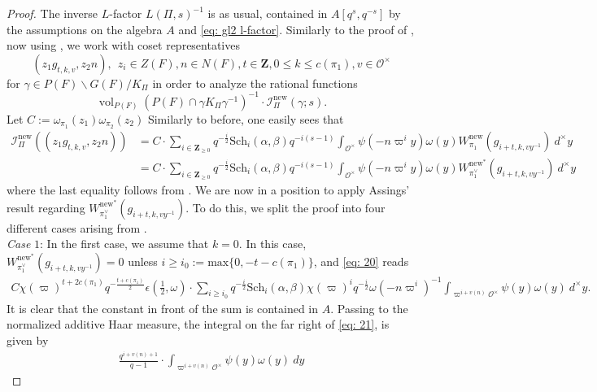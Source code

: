 \documentclass{amsart}
\theoremstyle{plain}
\theoremstyle{plain}
\theoremstyle{remark}
\DeclareMathOperator{\vol}{vol}
\begin{document}
\begin{proof}
   The inverse $L$-factor $L(\Pi,s)^{-1}$ is as usual, contained in $A[q^s,q^{-s}]$ by the assumptions on the algebra $A$ and \eqref{eq: gl2 l-factor}. Similarly to the proof of , now using , we work with coset representatives 
     $$(z_1g_{t,k,v},z_2n),\ \ z_i\in Z(F),n\in N(F),t\in\mathbf{Z}, 0\leq k\leq c(\pi_1), v\in\mathcal{O}^\times$$
     for $\gamma\in P(F)\backslash G(F)/K_\Pi$
     in order to analyze the rational functions 
     $$\vol_{P(F)}\left(P(F)\cap \gamma K_\Pi\gamma^{-1}\right)^{-1}\cdot \mathcal{I}_{\Pi}^\mathrm{new}(\gamma ;s).$$
     Let $C:=\omega_{\pi_1}(z_1)\omega_{\pi_2}(z_2)$ Similarly to before, one easily sees that 
     \begin{align}
       \nonumber \mathcal{I}_{\Pi}^\mathrm{new}((z_1g_{t,k,v},z_2n))&{=C\cdot \sum_{i\in\mathbf{Z}_{\geq 0}}q^{-\tfrac{i}{2}}\mathrm{Sch}_i(\alpha,\beta)q^{-i(s-1)}\int_{\mathcal{O}^\times}\psi(-n\varpi^i y)\omega(y) W_{\pi_1}^\mathrm{new}(g_{i+t,k,vy^{-1}})\ d^\times y}\\
         &{=C\cdot \sum_{i\in\mathbf{Z}_{\geq 0}}q^{-\tfrac{i}{2}}\mathrm{Sch}_i(\alpha,\beta)q^{-i(s-1)}\int_{\mathcal{O}^\times}\psi(-n\varpi^i y)\omega(y) W_{\pi_1^\vee}^{\mathrm{new}^*}(g_{i+t,k,vy^{-1}})\ d^\times y}\label{eq: 20}
     \end{align}
     where the last equality follows from . We are now in a position to apply Assings' result regarding $W_{\pi_1^\vee}^{\mathrm{new}^*}(g_{i+t,k,vy^{-1}})$. To do this, we split the proof into four different cases arising from .\\
     \textit{Case} $1$: In the first case, we assume that $k=0$. In this case, $W_{\pi_1^\vee}^{\mathrm{new}^*}(g_{i+t,k,vy^{-1}})=0$ unless $i\geq i_0:=\mathrm{max}\{0, -t-c(\pi_1)\}$, and \eqref{eq: 20} reads 
     \begin{align}\label{eq: 21}
        C\chi(\varpi)^{t+2c(\pi_1)}q^{-\tfrac{t+c(\pi_1)}{2}}\epsilon(\tfrac{1}{2},\omega)\cdot \sum_{i\geq i_0}q^{-\tfrac{i}{2}}\mathrm{Sch}_i(\alpha,\beta)\chi(\varpi)^iq^{-\tfrac{i}{2}}\omega(-n\varpi^i)^{-1}\int_{\varpi^{i+v(n)}\mathcal{O}^\times}\psi(y)\omega(y)\ d^\times y.
     \end{align}
     It is clear that the constant in front of the sum is contained in $A$. Passing to the normalized additive Haar measure, the integral on the far right of \eqref{eq: 21}, is given by 
     \begin{align}\label{eq: 22}\tfrac{q^{i+v(n)+1}}{q-1}\cdot \int_{\varpi^{i+v(n)}\mathcal{O}^\times}\psi(y)\omega(y)\ dy\end{align}

\end{proof}
\end{document}
